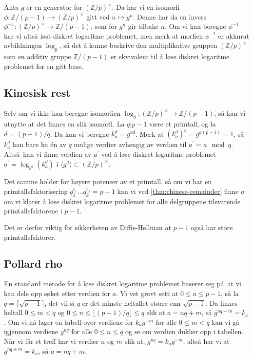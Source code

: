 Anta $g$ er en generator for ${(\mathbb Z / p)}^\times$.
Da har vi en isomorfi $\phi\colon \mathbb Z / (p - 1)\to {(\mathbb Z / p)}^\times$
gitt ved $n\mapsto g^n$.
Denne har da en invers
$\phi^{-1}\colon {(\mathbb Z / p)}^\times\to \mathbb Z / (p - 1)$,
som for $g^n$ gir tilbake $n$.
Om vi kan beregne $\phi^{-1}$ har vi altså løst diskret logaritme problemet,
men merk at morfien $\phi^{-1}$ er akkurat avbildningen $\log_g$,
så det å kunne beskrive den multiplikative gruppen ${(\mathbb Z / p)}^\times$
som en additiv gruppe $\mathbb Z / (p - 1)$
er ekvivalent til å løse diskret logaritme problemet for en gitt base.

\subsection{Kinesisk rest}
Selv om vi ikke kan beregne isomorfien
$\log_g\colon {(\mathbb Z / p)}^\times\to \mathbb Z / (p - 1)$,
så kan vi utnytte at det finnes en slik isomorfi.
La $q | p - 1$ være et primtall, og la $d = (p - 1) / q$.
Da kan vi beregne $k_a^d = g^{ad}$.
Merk at ${(k_a^d)}^q = g^{a(p - 1)} = 1$,
så $k_a^d$ kan bare ha \'en av $q$ mulige verdier avhengig
av verdien til $a^\prime = a\mod q$.
Altså kan vi finne verdien av $a^\prime$ ved å løse diskret logaritme problemet
$a^\prime = \log_{g^d}(k_a^d)$ i $\langle g^d\rangle\subset {(\mathbb Z / p)}^\times$.

Det samme holder for høyere potenser av et primtall,
så om vi har en primtallsfaktorisering $q_1^{r_1}\dots q_k^{r_k} = p - 1$
kan vi ved \cref{thm:chinese-remainder} finne $a$ om vi klarer å løse
diskret logaritme problemet for alle delgruppene tilsvarende primtallsfaktorene
i $p - 1$.

Det er derfor viktig for sikkerheten av Diffie-Hellman at $p - 1$ også har store
primtallsfaktorer.

\subsection{Pollard rho}
En standard metode \cite{pollard_monte_1978}
for å løse diskret logaritme problemet baserer seg på at
vi kan dele opp søket etter verdien for $a$.
Vi vet grovt sett at $0\leq a \leq p  - 1$,
så la $q = \lceil \sqrt{p - 1}\rceil$,
det vil si $q$ er det minste heltallet større enn $\sqrt {p - 1}$.
Da finnes heltall $0\leq m < q$ og $0\leq n \leq \lfloor(p - 1) / q\rfloor \leq q$
slik at $a = nq + m$, så $g^{nq + m} = k_a$.
Om vi nå lager en tabell over verdiene for $k_a g^{-m}$
for alle $0\leq m < q$ kan vi gå igjennom verdiene
$g^{nq}$ for alle $0\leq n\leq q$ og se om verdien dukker opp i tabellen.
Når vi får et treff har vi verdier $n$ og $m$ slik at,
$g^{nq} = k_a g^{-m}$,
altså har vi at $g^{nq + m} = k_a$,
så $a = nq + m$.

